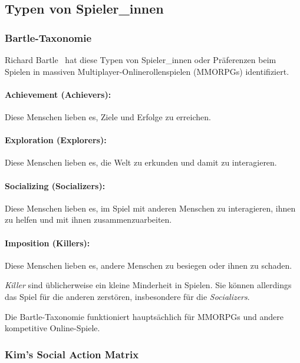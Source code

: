 \subsection{Typen von Spieler\_innen}
\label{spielertypen}


\subsubsection{Bartle-Taxonomie}
\label{bartle-taxonomie}

Richard Bartle~\cite{bartle-taxonomy} hat diese Typen von Spieler\_innen oder Präferenzen beim Spielen in massiven Multiplayer-Onlinerollenspielen (MMORPGs) identifiziert.

\paragraph{Achievement (Achievers):} Diese Menschen lieben es, Ziele und Erfolge zu erreichen.
\paragraph{Exploration (Explorers):} Diese Menschen lieben es, die Welt zu erkunden und damit zu interagieren.
\paragraph{Socializing (Socializers):} Diese Menschen lieben es, im Spiel mit anderen Menschen zu interagieren, ihnen zu helfen und mit ihnen zusammenzuarbeiten.
\paragraph{Imposition (Killers):} Diese Menschen lieben es, andere Menschen zu besiegen oder ihnen zu schaden.

\emph{Killer} sind üblicherweise ein kleine Minderheit in Spielen. Sie können allerdings das Spiel für die anderen zerstören, insbesondere für die \emph{Socializers}.

Die Bartle-Taxonomie funktioniert hauptsächlich für MMORPGs und andere kompetitive Online-Spiele.


\subsubsection{Kim’s Social Action Matrix}
\label{kims-social-action-matrix}

